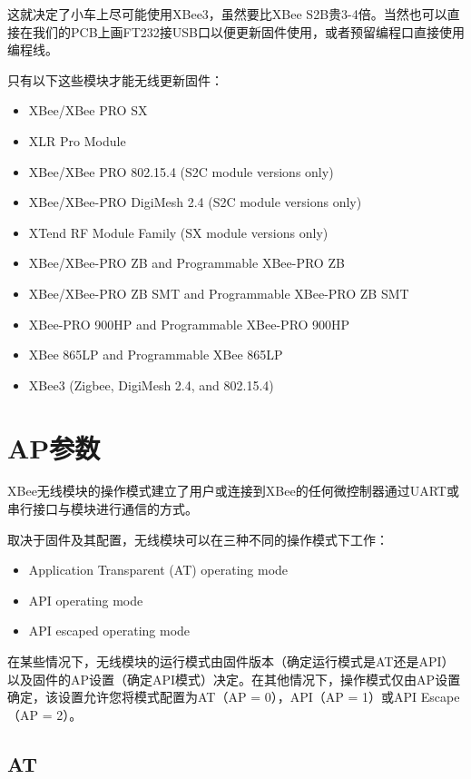 这就决定了小车上尽可能使用XBee3，虽然要比XBee S2B贵3-4倍。当然也可以直接在我们的PCB上画FT232接USB口以便更新固件使用，或者预留编程口直接使用编程线。

只有以下这些模块才能无线更新固件：

\begin{itemize}
    \item XBee/XBee PRO SX
    \item XLR Pro Module
    \item XBee/XBee PRO 802.15.4 (S2C module versions only)
    \item XBee/XBee-PRO DigiMesh 2.4 (S2C module versions only)
    \item XTend RF Module Family (SX module versions only)
    \item XBee/XBee-PRO ZB and Programmable XBee-PRO ZB
    \item XBee/XBee-PRO ZB SMT and Programmable XBee-PRO ZB SMT
    \item XBee-PRO 900HP and Programmable XBee-PRO 900HP
    \item XBee 865LP and Programmable XBee 865LP
    \item XBee3 (Zigbee, DigiMesh 2.4, and 802.15.4)
\end{itemize}

\section{AP参数}

XBee无线模块的操作模式建立了用户或连接到XBee的任何微控制器通过UART或串行接口与模块进行通信的方式。

取决于固件及其配置，无线模块可以在三种不同的操作模式下工作：

\begin{itemize}
    \item Application Transparent (AT) operating mode
    \item API operating mode
    \item API escaped operating mode
\end{itemize}

在某些情况下，无线模块的运行模式由固件版本（确定运行模式是AT还是API）以及固件的AP设置（确定API模式）决定。在其他情况下，操作模式仅由AP设置确定，该设置允许您将模式配置为AT（AP = 0），API（AP = 1）或API Escape（AP = 2）。

\subsection{AT}

